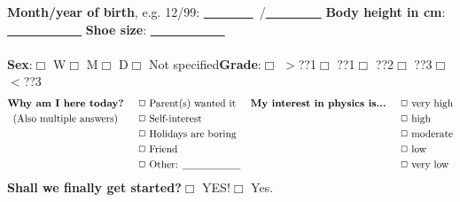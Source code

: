 \textbf{Month/year of birth}, \textsf{e.g. 12/99}: \underline{~~~~~~~~}~/\underline{~~~~~~~~~}\hspace{1cm} \textbf{Body height in cm}: \underline{~~~~~~~~~~~~}\hspace{1cm} \textbf{Shoe size}: \underline{~~~~~~~~~~~~} \\ 
\vspace{0.2cm}\\
\textbf{Sex}:\hspace{0.4cm}$\Box$ W\hspace{0.5cm}$\Box$ M\hspace{0.5cm}$\Box$ D\hspace{0.5cm}$\Box$ Not specified\hspace{1cm}\textbf{Grade}:\hspace{0.5cm}$\Box$ $>$??1\hspace{0.5cm}$\Box$ ??1\hspace{0.5cm}$\Box$ ??2\hspace{0.5cm}$\Box$ ??3\hspace{0.5cm}$\Box$ $<$??3 \\
\begin{align*}
\textmd{\textbf{Why am I here today?}}   \hspace{0.5cm}& \Box \textmd{ Parent(s) wanted it} &\textmd{\textbf{My interest in physics is...}}  \hspace{0.5cm}& \Box \textmd{ very high}\\
\textmd{(Also multiple answers)}   \hspace{0.7cm}&\Box \textmd{ Self-interest} && \Box \textmd{ high}\\
    &\Box \textmd{ Holidays are boring} && \Box \textmd{ moderate}\\
    &\Box \textmd{ Friend} && \Box \textmd{ low}\\
    &\Box \textmd{ Other: \underline{\hspace{2cm}}} && \Box \textmd{ very low}
\end{align*}
\textbf{Shall we finally get started?}\hspace{0.5cm}$\Box$ YES!\hspace{0.5cm}$\Box$ Yes. \newline
